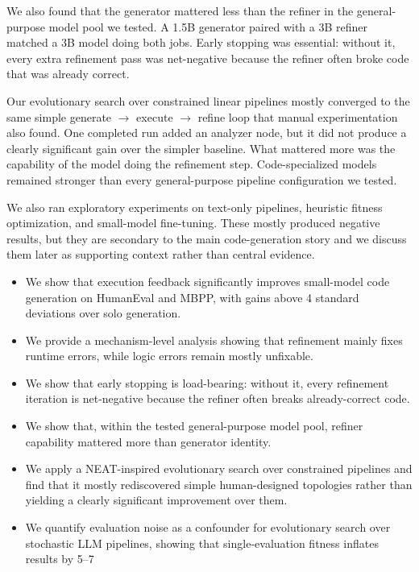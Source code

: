 \documentclass{article}
\begin{document}
We also found that the generator mattered less than the refiner in the general-purpose model pool we tested. A 1.5B generator paired with a 3B refiner matched a 3B model doing both jobs. Early stopping was essential: without it, every extra refinement pass was net-negative because the refiner often broke code that was already correct.

Our evolutionary search over constrained linear pipelines mostly converged to the same simple generate $\rightarrow$ execute $\rightarrow$ refine loop that manual experimentation also found. One completed run added an analyzer node, but it did not produce a clearly significant gain over the simpler baseline. What mattered more was the capability of the model doing the refinement step. Code-specialized models remained stronger than every general-purpose pipeline configuration we tested.

We also ran exploratory experiments on text-only pipelines, heuristic fitness optimization, and small-model fine-tuning. These mostly produced negative results, but they are secondary to the main code-generation story and we discuss them later as supporting context rather than central evidence. 

\begin{itemize}
    \item We show that execution feedback significantly improves small-model code generation on HumanEval and MBPP, with gains above 4 standard deviations over solo generation.
    \item We provide a mechanism-level analysis showing that refinement mainly fixes runtime errors, while logic errors remain mostly unfixable.
    \item We show that early stopping is load-bearing: without it, every refinement iteration is net-negative because the refiner often breaks already-correct code.
    \item We show that, within the tested general-purpose model pool, refiner capability mattered more than generator identity.
    \item We apply a NEAT-inspired evolutionary search over constrained pipelines and find that it mostly rediscovered simple human-designed topologies rather than yielding a clearly significant improvement over them.
    \item We quantify evaluation noise as a confounder for evolutionary search over stochastic LLM pipelines, showing that single-evaluation fitness inflates results by 5--7%
\end{itemize}
\end{document}
